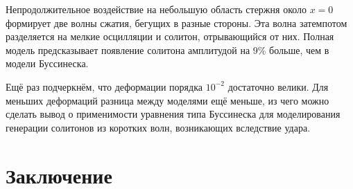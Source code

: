 \documentclass[12pt, a4paper]{report}
\begin{document}
Непродолжительное воздействие на небольшую область стержня около $x=0$ формирует две волны сжатия, бегущих в разные стороны. Эта волна затемпотом разделяется на мелкие осцилляции и солитон, отрывающийся от них. Полная модель предсказывает появление солитона амплитудой на 9\% больше, чем в модели Буссинеска.

Ещё раз подчеркнём, что деформации порядка $10^{-2}$ достаточно велики. Для меньших деформаций разница между моделями ещё меньше, из чего можно сделать вывод о применимости уравнения типа Буссинеска для моделирования генерации солитонов из коротких волн, возникающих вследствие удара.






\chapter*{Заключение}
\end{document}

